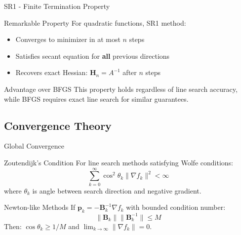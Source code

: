 \documentclass[aspectratio=1610]{beamer}
\begin{document}
\begin{frame}{SR1 - Finite Termination Property}
  \begin{block}{Remarkable Property}
    For quadratic functions, SR1 method:
    \begin{itemize}
      \item Converges to minimizer in at most $n$ steps
      \item Satisfies secant equation for \textbf{all} previous directions
      \item Recovers exact Hessian: $\mathbf{H}_n = A^{-1}$ after $n$ steps
    \end{itemize}
  \end{block}
  
  \vspace{0.5cm}
  \begin{block}{Advantage over BFGS}
    This property holds regardless of line search accuracy, while BFGS requires exact line search for similar guarantees.
  \end{block}
\end{frame}

\subsection{Convergence Theory}

\begin{frame}{Global Convergence}
  \begin{block}{Zoutendijk's Condition}
    For line search methods satisfying Wolfe conditions:
    $$\sum_{k=0}^{\infty} \cos^2 \theta_k \|\nabla f_k\|^2 < \infty$$
    where $\theta_k$ is angle between search direction and negative gradient.
  \end{block}
  
  \vspace{0.5cm}
  \begin{block}{Newton-like Methods}
    If $\mathbf{p}_k = -\mathbf{B}_k^{-1} \nabla f_k$ with bounded condition number:
    $$\|\mathbf{B}_k\|\|\mathbf{B}_k^{-1}\| \leq M$$
    Then: $\cos \theta_k \geq 1/M$ and $\lim_{k \to \infty} \|\nabla f_k\| = 0$.
  \end{block}
\end{frame}
\end{document}
